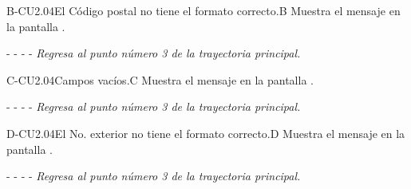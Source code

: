    
	\begin{UCtrayectoriaA}{B-CU2.04}{El Código postal no tiene el formato correcto.}{B}
			\UCpaso[\UCsist] Muestra el mensaje  en la pantalla .
			\item[- -] - - {\em Regresa al punto número 3 de la trayectoria principal.} 
    \end{UCtrayectoriaA}
	\begin{UCtrayectoriaA}{C-CU2.04}{Campos vacíos.}{C}
		\UCpaso[\UCsist]Muestra el mensaje en la pantalla .
	    
	    \item[- -] - - {\em Regresa al punto número 3 de la trayectoria principal.}
	\end{UCtrayectoriaA}

    



	
	\begin{UCtrayectoriaA}{D-CU2.04}{El No. exterior no tiene el formato correcto.}{D}
			\UCpaso[\UCsist] Muestra el mensaje  en la pantalla .
			\item[- -] - - {\em Regresa al punto número 3 de la trayectoria principal.} 
    \end{UCtrayectoriaA}
	
	

